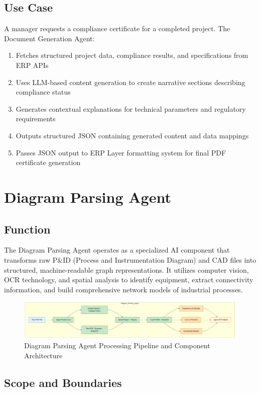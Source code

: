 \documentclass[12pt]{report}
\begin{document}
\section{Use Case}
A manager requests a compliance certificate for a completed project. The Document Generation Agent:
\begin{enumerate}
  \item Fetches structured project data, compliance results, and specifications from ERP APIs
  \item Uses LLM-based content generation to create narrative sections describing compliance status
  \item Generates contextual explanations for technical parameters and regulatory requirements
  \item Outputs structured JSON containing generated content and data mappings
  \item Passes JSON output to ERP Layer formatting system for final PDF certificate generation
\end{enumerate}

\chapter{Diagram Parsing Agent}
\section{Function}
The Diagram Parsing Agent operates as a specialized AI component that transforms raw P\&ID (Process and Instrumentation Diagram) and CAD files into structured, machine-readable graph representations. It utilizes computer vision, OCR technology, and spatial analysis to identify equipment, extract connectivity information, and build comprehensive network models of industrial processes.

\begin{figure}[htbp]
\centering
\includegraphics[width=\textwidth,height=1.2\textheight,keepaspectratio]{../../pics/diagram-parser.png}
\caption{Diagram Parsing Agent Processing Pipeline and Component Architecture}
\label{fig:diagram-parser-workflow}
\end{figure}

\section{Scope and Boundaries}
\end{document}
